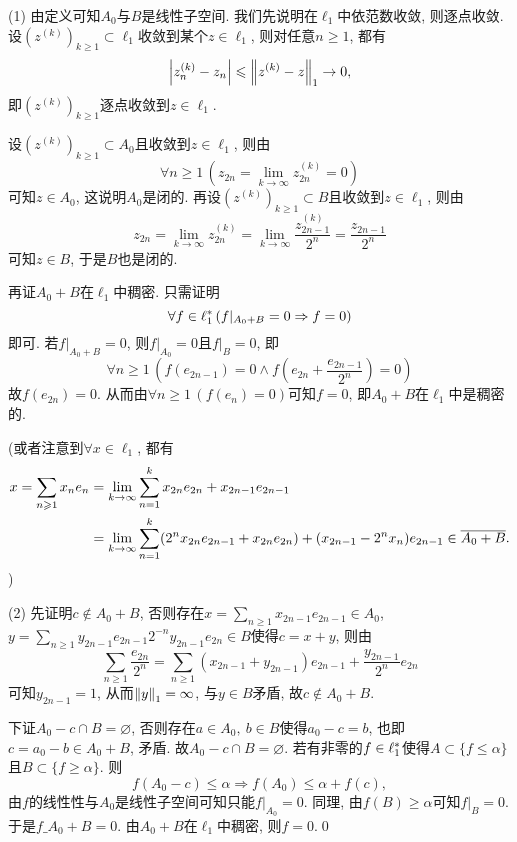 	\begin{Proof}
	(1) 由定义可知$ A_0 $与$ B $是线性子空间. 我们先说明在$ \ell_1 $中依范数收敛, 则逐点收敛. 设$ (z^{(k)})_{k\geqslant 1}\subset\ell_1 $收敛到某个$ z\in\ell_1 $, 则对任意$ n\geqslant 1 $, 都有
	\[
	\abs{z_n^{(k)}-z_n}\leqslant\norm{z^{(k)}-z}_1\to 0,
	\]
	即$ (z^{(k)})_{k\geqslant 1} $逐点收敛到$ z\in\ell_1 $.
	
	设$ (z^{(k)})_{k\geqslant 1}\subset A_0 $且收敛到$ z\in\ell_1 $, 则由
	\[
	\forall n\geqslant 1\,(z_{2n}=\lim_{k\to\infty}z_{2n}^{(k)}=0)
	\]
	可知$ z\in A_0 $, 这说明$ A_0 $是闭的. 再设$ (z^{(k)})_{k\geqslant 1}\subset B $且收敛到$ z\in\ell_1 $, 则由
	\[
	z_{2n}=\lim_{k\to\infty}z_{2n}^{(k)}=\lim_{k\to\infty}\frac{z_{2n-1}^{(k)}}{2^n}=\frac{z_{2n-1}}{2^n}
	\]
	可知$ z\in B $, 于是$ B $也是闭的.
	
	再证$ A_0+B $在$ \ell_1 $中稠密. 只需证明
	\[
	\forall f\in\Star{\ell_1}\,(f|_{A_0+B}=0\Rightarrow f=0)
	\]
	即可. 若$ f|_{A_0+B}=0 $, 则$ f|_{A_0}=0 $且$ f|_B=0 $, 即
	\[
	\forall n\geqslant 1\,\left(f(e_{2n-1})=0\land f\left(e_{2n}+\frac{e_{2n-1}}{2^n}\right)=0\right)
	\]
	故$ f(e_{2n})=0 $. 从而由$ \forall n\geqslant 1\,(f(e_n)=0) $可知$ f=0 $, 即$ A_0+B $在$ \ell_1 $中是稠密的.
	
	(或者注意到$ \forall x\in\ell_1 $, 都有
	\[
	\begin{aligned}
	x=\sum_{n\geqslant 1}x_ne_n&=\lim_{k\to\infty}\sum_{n=1}^kx_{2n}e_{2n}+x_{2n-1}e_{2n-1}\\
	&=\lim_{k\to\infty}\sum_{n=1}^k(2^nx_{2n}e_{2n-1}+x_{2n}e_{2n})+(x_{2n-1}-2^nx_n)e_{2n-1}\in\baro{A_0+B}.
	\end{aligned}
	\]
	)
	
	(2) 先证明$ c\notin A_0+B $, 否则存在$ x=\sum\limits_{n\geqslant 1}x_{2n-1}e_{2n-1}\in A_0 $, $ y=\sum\limits_{n\geqslant 1}y_{2n-1}e_{2n-1}2^{-n}y_{2n-1}e_{2n}\in B $使得$ c=x+y $, 则由
	\[
	\sum_{n\geqslant 1}\frac{e_{2n}}{2^n}=\sum_{n\geqslant 1}(x_{2n-1}+y_{2n-1})e_{2n-1}+\frac{y_{2n-1}}{2^n}e_{2n}
	\]
	可知$ y_{2n-1}=1 $, 从而$ \norm{y}_1=\infty $, 与$ y\in B $矛盾, 故$ c\notin A_0+B $.
	
	下证$ A_0-c\cap B=\varnothing $, 否则存在$ a\in A_0,\ b\in B $使得$ a_0-c=b $, 也即$ c=a_0-b\in A_0+B $, 矛盾. 故$ A_0-c\cap B=\varnothing $. 若有非零的$ f\in\Star{\ell_1} $使得$ A\subset\{ f\leqslant\alpha \} $且$ B\subset\{ f\geqslant\alpha \} $. 则
	\[
	f(A_0-c)\leqslant\alpha\Longrightarrow f(A_0)\leqslant\alpha+f(c),
	\]
	由$ f $的线性性与$ A_0 $是线性子空间可知只能$ f|_{A_0}=0 $. 同理, 由$ f(B)\geqslant\alpha $可知$ f|_B=0 $. 于是$ f\_{A_0+B}=0 $. 由$ A_0+B $在$ \ell_1 $中稠密, 则$ f=0 $.\qed
	\end{Proof}
	
